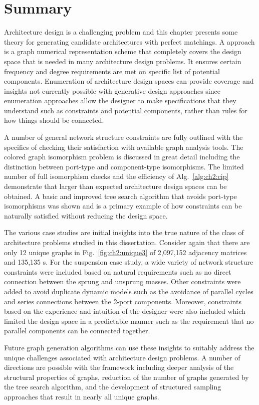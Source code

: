 \section{Summary}

Architecture design is a challenging problem and this chapter presents some theory for generating candidate architectures with perfect matchings.
A \mypm{} approach is a graph numerical representation scheme that completely covers the design space that is needed in many architecture design problems.
It ensures certain frequency and degree requirements are met on specific list of potential components.
Enumeration of architecture design spaces can provide coverage and insights not currently possible with generative design approaches since enumeration approaches allow the designer to make specifications that they understand such as constraints and potential components, rather than rules for how things should be connected.

A number of general network structure constraints are fully outlined with the specifics of checking their satisfaction with available graph analysis tools.
The colored graph isomorphism problem is discussed in great detail including the distinction between port-type and component-type isomorphisms.
The limited number of full isomorphism checks and the efficiency of Alg.~\ref{alg:ch2:cip} demonstrate that larger than expected architecture design spaces can be obtained.
A basic and improved tree search algorithm that avoids port-type isomorphisms was shown and is a primary example of how constraints can be naturally satisfied without reducing the design space.

The various case studies are initial insights into the true nature of the class of architecture problems studied in this dissertation.
Consider again that there are only 12 unique graphs in Fig.~\ref{fig:ch2:unique3} of 2,097,152 adjacency matrices and 135,135 \mypm{}s.
For the suspension case study, a wide variety of network structure constraints were included based on natural requirements such as no direct connection between the sprung and unsprung masses.
Other constraints were added to avoid duplicate dynamic models such as the avoidance of parallel cycles and series connections between the 2-port components.
Moreover, constraints based on the experience and intuition of the designer were also included which limited the design space in a predictable manner such as the requirement that no parallel components can be connected together.

Future graph generation algorithms can use these insights to suitably address the unique challenges associated with architecture design problems.
A number of directions are possible with the \mypm{} framework including deeper analysis of the structural properties of \mypm{} graphs, reduction of the number of graphs generated by the tree search algorithm, and the development of structured sampling approaches that result in nearly all unique graphs.